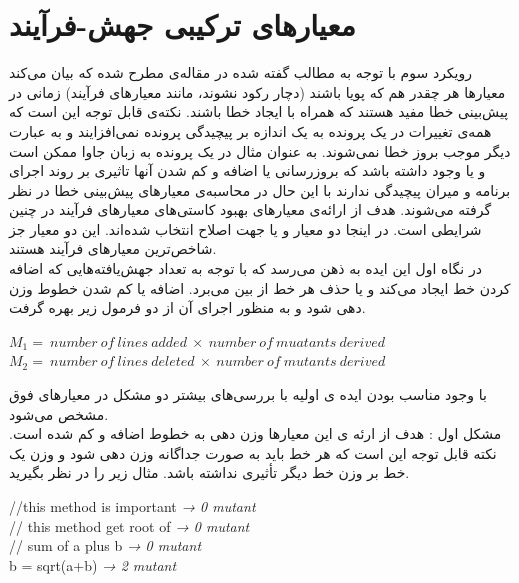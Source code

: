 \section{معیارهای ترکیبی جهش-فرآیند}
رویکرد سوم با توجه به مطالب گفته شده در مقاله‌ی \cite{rahman2013and} مطرح شده که بیان می‌کند معیارها هر چقدر هم که پویا باشند (دچار رکود نشوند، مانند معیارهای فرآیند) زمانی در پیش‌بینی خطا مفید هستند که همراه با ایجاد خطا باشند. نکته‌ی قابل توجه این است که همه‌ی تغییرات در یک پرونده به یک اندازه  بر پیچیدگی پرونده نمی‌افزایند و به عبارت دیگر موجب بروز خطا نمی‌شوند. به عنوان مثال در یک پرونده به زبان جاوا ممکن است  و یا  وجود داشته باشد که بروزرسانی یا اضافه و کم شدن آنها تاثیری بر روند اجرای برنامه و میران پیچیدگی ندارند با این حال در محاسبه‌ی معیارهای پیش‌بینی خطا در نظر گرفته می‌شوند. هدف از ارائه‌ی معیارهای  بهبود کاستی‌های معیارهای فرآیند در چنین شرایطی است. در اینجا دو معیار  و یا   جهت اصلاح انتخاب شده‌اند.  این دو معیار جز شاخص‌ترین معیارهای فرآیند هستند.\\
در نگاه اول  این ایده به ذهن می‌رسد که با توجه به تعداد جهش‌یافته‌هایی که  اضافه   کردن  خط ایجاد می‌کند و یا حذف هر خط  از بین می‌برد. اضافه یا کم شدن خطوط وزن دهی شود و به منظور اجرای آن از دو  فرمول زیر بهره گرفت.\\
\begin{latin}
	
	$M_1 =\ number\ of\ lines\ added\ \times \ number\ of\ muatants\ derived$\\
	
	$M_2 =\ number\ of\ lines\ deleted\ \times \ number\ of\ mutants\ derived$\\
\end{latin}


با وجود مناسب بودن ایده ی اولیه با بررسی‌های بیشتر دو مشکل در معیارهای فوق مشخص می‌شود.\\
مشکل اول : هدف از ارئه ی این معیارها وزن دهی به خطوط اضافه و کم شده است. نکته قابل توجه این است که هر خط باید به صورت جداگانه وزن دهی شود و وزن یک خط بر وزن خط دیگر تأثیری نداشته باشد. مثال زیر را در نظر بگیرید.
\begin{latin}
\flushleft
//this method is important  \emph{→ 0 mutant} \\
// this method get root of \emph{→ 0 mutant}\\
// sum of a plus b \emph{→ 0 mutant} \\ 
b = sqrt(a+b) \emph{→ 2 mutant} \\
\end{latin}

